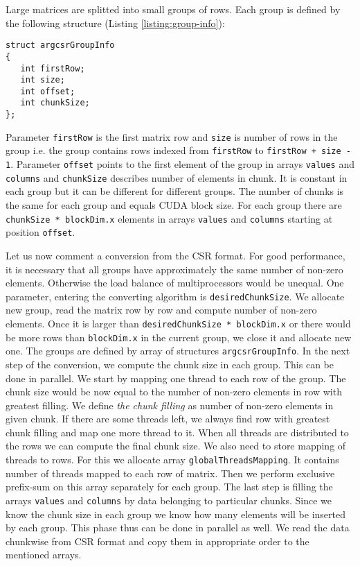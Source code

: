 \documentclass{pj}
\begin{document}
Large matrices are splitted into small groups of rows. Each group is defined by the following structure (Listing \ref{listing:group-info}):
\begin{lstlisting}[caption={Structure defining group of rows},label={listing:group-info}]
struct argcsrGroupInfo
{
   int firstRow;
   int size;
   int offset;
   int chunkSize;
};
\end{lstlisting}
Parameter {\tt firstRow} is the first matrix row and {\tt size} is number of rows in the group i.e. the group contains rows indexed from {\tt firstRow} to {\tt firstRow + size - 1}. Parameter {\tt offset} points to the first element of the group in arrays {\tt values} and {\tt columns} and {\tt chunkSize} describes number of elements in chunk. It is constant in each group but it can be different for different groups. The number of chunks is the same for each group and equals CUDA block size. For each group there are {\tt chunkSize * blockDim.x} elements in arrays {\tt values} and {\tt columns} starting at position {\tt offset}. 

Let us now comment a conversion from the CSR format. For good performance, it is necessary that all groups have approximately the same number of non-zero elements. Otherwise the load balance of multiprocessors would be unequal. One parameter, entering the converting algorithm is {\tt desiredChunkSize}. We allocate new group, read the matrix row by row and compute number of non-zero elements. Once it is larger than {\tt desiredChunkSize * blockDim.x} or there would be more rows than {\tt blockDim.x} in the current group, we close it and allocate new one. The groups are defined by array of structures {\tt argcsrGroupInfo}. In the next step of the conversion, we compute the chunk size in each group. This can be done in parallel. We start by mapping one thread to each row of the group. The chunk size would be now equal to the number of non-zero elements in row with greatest filling. We define {\it the chunk filling} as number of non-zero elements in given chunk. If there are some threads left, we always find row with greatest chunk filling and map one more thread to it. When all threads are distributed to the rows we can compute the final chunk size. We also need to store mapping of threads to rows. For this we allocate array {\tt globalThreadsMapping}. It contains number of threads mapped to each row of matrix. Then we perform exclusive prefix-sum on this array separately for each group.  The last step is filling the arrays {\tt values} and {\tt columns} by data belonging to particular chunks. Since we know the chunk size in each group we know how many elements will be inserted by each group. This phase thus can be done in parallel as well. We read the data chunkwise from CSR format and copy them in appropriate order to the mentioned arrays.
\end{document}
